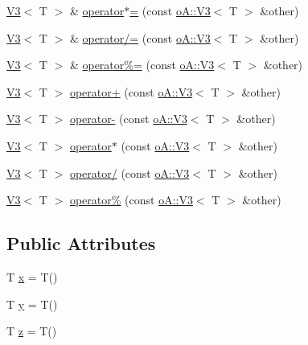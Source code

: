 \begin{DoxyCompactItemize}
\item 
\mbox{\hyperlink{structo_a_1_1_v3}{V3}}$<$ T $>$ \& \mbox{\hyperlink{structo_a_1_1_v3_afa355bab009db6eae651e834cdaf9cc4}{operator$\ast$=}} (const \mbox{\hyperlink{structo_a_1_1_v3}{o\+A\+::\+V3}}$<$ T $>$ \&other)
\item 
\mbox{\hyperlink{structo_a_1_1_v3}{V3}}$<$ T $>$ \& \mbox{\hyperlink{structo_a_1_1_v3_a6bd81647929ff9d4ba4aa992074317e2}{operator/=}} (const \mbox{\hyperlink{structo_a_1_1_v3}{o\+A\+::\+V3}}$<$ T $>$ \&other)
\item 
\mbox{\hyperlink{structo_a_1_1_v3}{V3}}$<$ T $>$ \& \mbox{\hyperlink{structo_a_1_1_v3_ad311ac93d7c947c590a45320fbee26ac}{operator\%=}} (const \mbox{\hyperlink{structo_a_1_1_v3}{o\+A\+::\+V3}}$<$ T $>$ \&other)
\item 
\mbox{\hyperlink{structo_a_1_1_v3}{V3}}$<$ T $>$ \mbox{\hyperlink{structo_a_1_1_v3_a2cf028f3352c9165b24f26e5c2bb173d}{operator+}} (const \mbox{\hyperlink{structo_a_1_1_v3}{o\+A\+::\+V3}}$<$ T $>$ \&other)
\item 
\mbox{\hyperlink{structo_a_1_1_v3}{V3}}$<$ T $>$ \mbox{\hyperlink{structo_a_1_1_v3_a3e6d329582bd5e0b4ca407576b5135e4}{operator-\/}} (const \mbox{\hyperlink{structo_a_1_1_v3}{o\+A\+::\+V3}}$<$ T $>$ \&other)
\item 
\mbox{\hyperlink{structo_a_1_1_v3}{V3}}$<$ T $>$ \mbox{\hyperlink{structo_a_1_1_v3_a6171d787358a1cffd89786d4f13578bb}{operator$\ast$}} (const \mbox{\hyperlink{structo_a_1_1_v3}{o\+A\+::\+V3}}$<$ T $>$ \&other)
\item 
\mbox{\hyperlink{structo_a_1_1_v3}{V3}}$<$ T $>$ \mbox{\hyperlink{structo_a_1_1_v3_a46bcba5d859f26e3ecffd4ceb7ca275f}{operator/}} (const \mbox{\hyperlink{structo_a_1_1_v3}{o\+A\+::\+V3}}$<$ T $>$ \&other)
\item 
\mbox{\hyperlink{structo_a_1_1_v3}{V3}}$<$ T $>$ \mbox{\hyperlink{structo_a_1_1_v3_a22fc8caa2afd56b20cc0239583695014}{operator\%}} (const \mbox{\hyperlink{structo_a_1_1_v3}{o\+A\+::\+V3}}$<$ T $>$ \&other)
\end{DoxyCompactItemize}
\subsection*{Public Attributes}
\begin{DoxyCompactItemize}
\item 
T \mbox{\hyperlink{structo_a_1_1_v3_a2171113146a81277db6009a5c6af883f}{x}} = T()
\item 
T \mbox{\hyperlink{structo_a_1_1_v3_a04cf470d60a012fe0dc40a92c7ec9e73}{y}} = T()
\item 
T \mbox{\hyperlink{structo_a_1_1_v3_a30e27d6464ac2143637bfc675a1e5dd7}{z}} = T()
\end{DoxyCompactItemize}


